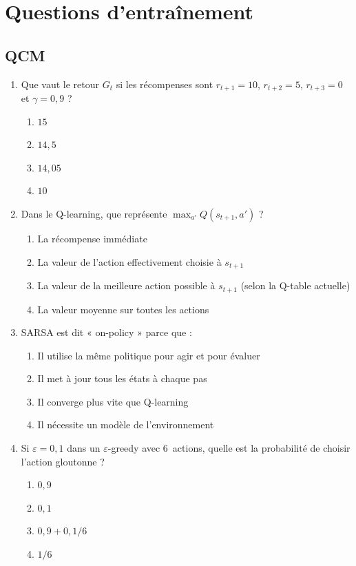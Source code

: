 \documentclass[11pt,a4paper]{article}
\begin{document}
\section{Questions d'entraînement}
\label{sec:questions}

\subsection{QCM}

\begin{enumerate}
\item Que vaut le retour $G_t$ si les récompenses sont $r_{t+1} = 10$, $r_{t+2} = 5$, $r_{t+3} = 0$ et $\gamma = 0{,}9$ ?
\begin{enumerate}[label=\alph*)]
  \item $15$
  \item $14{,}5$
  \item $14{,}05$
  \item $10$
\end{enumerate}

\item Dans le Q-learning, que représente $\max_{a'} Q(s_{t+1}, a')$ ?
\begin{enumerate}[label=\alph*)]
  \item La récompense immédiate
  \item La valeur de l'action effectivement choisie à $s_{t+1}$
  \item La valeur de la meilleure action possible à $s_{t+1}$ (selon la Q-table actuelle)
  \item La valeur moyenne sur toutes les actions
\end{enumerate}

\item SARSA est dit « on-policy » parce que :
\begin{enumerate}[label=\alph*)]
  \item Il utilise la même politique pour agir et pour évaluer
  \item Il met à jour tous les états à chaque pas
  \item Il converge plus vite que Q-learning
  \item Il nécessite un modèle de l'environnement
\end{enumerate}

\item Si $\varepsilon = 0{,}1$ dans un $\varepsilon$-greedy avec 6~actions, quelle est la probabilité de choisir l'action gloutonne ?
\begin{enumerate}[label=\alph*)]
  \item $0{,}9$
  \item $0{,}1$
  \item $0{,}9 + 0{,}1 / 6$
  \item $1 / 6$
\end{enumerate}


\end{enumerate}
\end{document}
